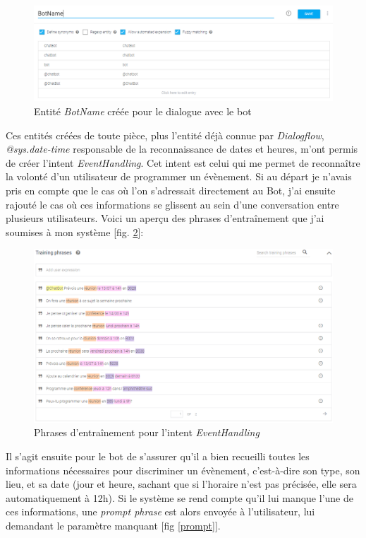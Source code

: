\documentclass[stage2a]{tnreport} %
\begin{document}
\begin{figure}[h!]
    \centering
    \includegraphics[width=\textwidth]{figures/botname.PNG}
    \caption{Entité \emph{BotName} créée pour le dialogue avec le bot}
    \label{BotName}
\end{figure}
\vspace{\linewidth}

Ces entités créées de toute pièce, plus l'entité déjà connue par \emph{Dialogflow}, \emph{@sys.date-time} responsable de la reconnaissance de dates et heures, m'ont permis de créer l'intent \emph{EventHandling}. Cet intent est celui qui me permet de reconnaître la volonté d'un utilisateur de programmer un évènement. Si au départ je n'avais pris en compte que le cas où l'on s'adressait directement au Bot, j'ai ensuite rajouté le cas où ces informations se glissent au sein d'une conversation entre plusieurs utilisateurs. Voici un aperçu des phrases d'entraînement que j'ai soumises à mon système [fig. \ref{EHtp}]:\\

\begin{figure}[h!]
    \centering
    \includegraphics[width=\textwidth]{figures/EHtraining.PNG}
    \caption{Phrases d'entraînement pour l'intent \emph{EventHandling}}
    \label{EHtp}
\end{figure}


Il s'agit ensuite pour le bot de s'assurer qu'il a bien recueilli toutes les informations nécessaires pour discriminer un évènement, c'est-à-dire son type, son lieu, et sa date (jour et heure, sachant que si l'horaire n'est pas précisée, elle sera automatiquement à 12h). Si le système se rend compte qu'il lui manque l'une de ces informations, une \emph{prompt phrase} est alors envoyée à l'utilisateur, lui demandant le paramètre manquant [fig \ref{prompt}]. \\
\end{document}
